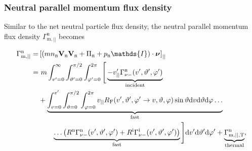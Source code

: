 \subsubsection{Neutral parallel momentum flux density}


Similar to the net neutral particle flux density, the neutral parallel momentum flux density $\Gamma_{\mathrm{m},||}^{\mathrm{n}}$ becomes

\begin{align}
\Gamma_{\mathrm{m},||}^{\mathrm{n}} =& \left[ \left( m\nn\Vn\Vn + \viscn + \pn \mathds{I} \right) \cdot \Nu \right]_{||} \label{eq:momfluxp} \\
=& \ m \int_{v'=0}^{\infty} \int_{\vartheta'=0}^{\pi/2} \int_{\varphi'=0}^{2\pi} \Bigg [ \underbrace{-v'_{||} \Gamma_{\nu-}^{\mathrm{n}}(v',\vartheta',\varphi')}_{\text{incident}} \nonumber \\
& + \underbrace{\int_{v=0}^{v'} \int_{\vartheta=0}^{\pi/2} \int_{\varphi=0}^{2\pi} v_{||}  R_{\mathrm{F}}(v',\vartheta',\varphi' \rightarrow v, \vartheta,\varphi)\sin \vartheta \dd v \dd \vartheta \dd \varphi\ldots}_{\text{fast}} \nonumber \\
&\qquad \underbrace{\ldots \left (\Rnx \Gamma_{\nu-}^{\mathrm{n}}(v',\vartheta',\varphi') + \Ri \Gamma_{\nu-}^{\mathrm{i}}(v',\vartheta',\varphi')\right )}_{\text{fast}} \Bigg ] \dd v' \dd \vartheta' \dd \varphi' + \underbrace{\Gamma_{\mathrm{m},||,\mathrm{T}}^{\mathrm{n}}}_{\text{thermal}}, \label{eq:Gammamp}
\end{align}

